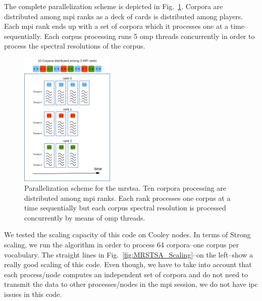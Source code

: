 \documentclass[11pt,a4paper]{article}
\begin{document}
The complete parallelization scheme is depicted in Fig.~\ref{fig:MRSTSA_Parallelization}. Corpora are distributed among \gls{mpi} ranks as a deck of cards is distributed among players. Each \gls{mpi} rank ends up with a set of corpora which it processes one at a time--sequentially. Each corpus processing runs 5 \gls{omp} threads concurrently in order to process the spectral resolutions of the corpus. 

\begin{figure}[h!]
    \centering
    \includegraphics[width=0.4\textwidth]{MRSTSA_Parallelization.png}
    \caption{Parallelization scheme for the \gls{mrstsa}. Ten corpora processing are distributed among \gls{mpi} ranks. Each rank processes one corpus at a time sequentially but each corpus spectral resolution is processed concurrently by means of \gls{omp} threads.}
    \label{fig:MRSTSA_Parallelization}
\end{figure}

We tested the scaling capacity of this code on Cooley nodes. In terms of Strong scaling, we run the algorithm in order to process 64 corpora--one corpus per vocabulary. The straight lines in Fig.~\ref{fig:MRSTSA_Scaling}--on the left--show a really good scaling of this code. Even though, we have to take into account that each process/node computes an independent set of corpora and do not need to transmit the data to other processes/nodes in the \gls{mpi} session, we do not have \gls{ipc} issues in this code. 
\end{document}
